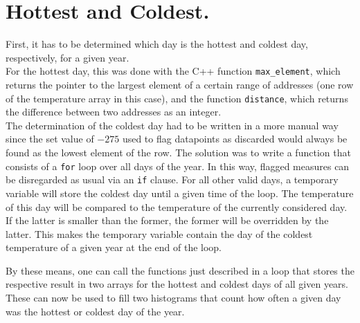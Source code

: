 \section*{Hottest and Coldest.}
First, it has to be determined which day is the hottest and coldest day, respectively, for a given year.\\
For the hottest day, this was done with the C++ function \texttt{max\_element}, which returns the pointer to the largest element of a certain range of addresses (one row of the temperature array in this case), and the function \texttt{distance}, which returns the difference between two addresses as an integer.\\
The determination of the coldest day had to be written in a more manual way since the set value of $-275$ used to flag datapoints as discarded would always be found as the lowest element of the row. The solution was to write a function that consists of a \texttt{for} loop over all days of the year. In this way, flagged measures can be disregarded as usual via an \texttt{if} clause. For all other valid days, a temporary variable will store the coldest day until a given time of the loop. The temperature of this day will be compared to the temperature of the currently considered day. If the latter is smaller than the former, the former will be overridden by the latter. This makes the temporary variable contain the day of the coldest temperature of a given year at the end of the loop. \par
By these means, one can call the functions just described in a loop that stores the respective result in two arrays for the hottest and coldest days of all given years. These can now be used to fill two histograms that count how often a given day was the hottest or coldest day of the year.%